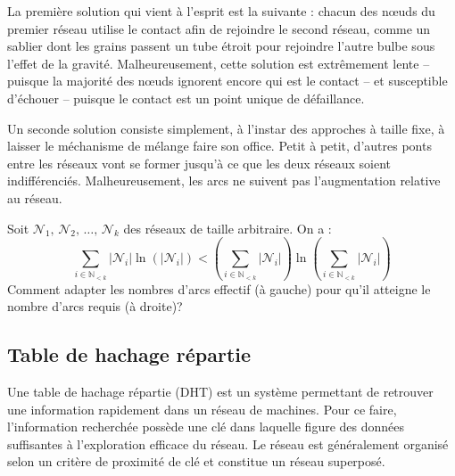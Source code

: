 La première solution qui vient à l'esprit est la suivante : chacun des nœuds du
premier réseau utilise le contact afin de rejoindre le second réseau, comme un
sablier dont les grains passent un tube étroit pour rejoindre l'autre bulbe sous
l'effet de la gravité. Malheureusement, cette solution est extrêmement lente --
puisque la majorité des nœuds ignorent encore qui est le contact -- et
susceptible d'échouer -- puisque le contact est un point unique de défaillance.

Un seconde solution consiste simplement, à l'instar des approches à taille fixe,
à laisser le méchanisme de mélange faire son office. Petit à petit, d'autres
ponts entre les réseaux vont se former jusqu'à ce que les deux réseaux soient
indifférenciés. Malheureusement, les arcs ne suivent pas l'augmentation relative
au réseau.

\begin{problem}
  Soit $\mathcal{N}_1,\, \mathcal{N}_2,\, \ldots ,\, \mathcal{N}_k$ des réseaux
  de taille arbitraire. On a :
\begin{equation}
  \sum\limits_{i \in \mathbb{N}_{<k}} |\mathcal{N}_i|\ln (|\mathcal{N}_i|) < (\sum\limits_{i \in \mathbb{N}_{<k}} |\mathcal{N}_i|)\ln{(\sum\limits_{i \in \mathbb{N}_{<k}} |\mathcal{N}_i|)}
\end{equation}
Comment adapter les nombres d'arcs effectif (à gauche) pour qu'il atteigne le
nombre d'arcs requis (à droite)?
\end{problem}



\subsection{Table de hachage répartie}

Une table de hachage répartie (DHT) est un système permettant de retrouver une
information rapidement dans un réseau de machines. Pour ce faire, l'information
recherchée possède une clé dans laquelle figure des données suffisantes à
l'exploration efficace du réseau. Le réseau est généralement organisé selon un
critère de proximité de clé et constitue un réseau superposé. 

